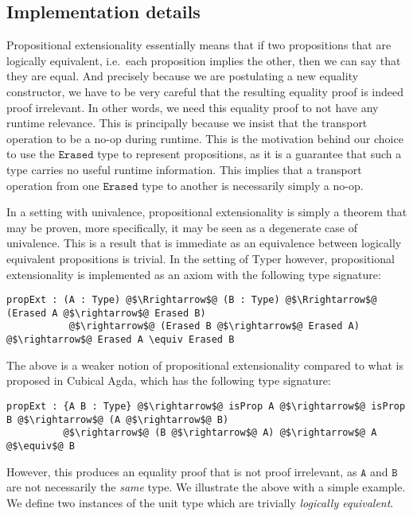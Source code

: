 \documentclass[12pt,twoside,maitrise]{dms}
\theoremstyle{definition}
\numberwithin{equation}{section}
\numberwithin{table}{chapter}
\numberwithin{figure}{chapter}
\newcommand\id[1] {\texttt{#1}}
\begin{document}
\subsection*{Implementation details}

Propositional extensionality essentially means that if two propositions that are
logically equivalent, i.e.\ each proposition implies the other, then we can say
that they are equal. And precisely because we are postulating a new equality
constructor, we have to be very careful that the resulting equality proof is
indeed proof irrelevant. In other words, we need this equality proof to not have
any runtime relevance. This is principally because we insist that the transport
operation to be a no-op during runtime. This is the motivation behind our choice
to use the $\id{Erased}$ type to represent propositions, as it is a guarantee
that such a type carries no useful runtime information. This implies that a
transport operation from one $\id{Erased}$ type to another is necessarily simply
a no-op.

In a setting with univalence, propositional extensionality is simply a theorem
that may be proven, more specifically, it may be seen as a degenerate case of univalence\cite{sozeau2013univalence}. This is a result that is
immediate as an equivalence between logically equivalent propositions is
trivial. In the setting of Typer however, propositional extensionality is
implemented as an axiom with the following type signature:

\begin{verbatim}
propExt : (A : Type) @$\Rrightarrow$@ (B : Type) @$\Rrightarrow$@ (Erased A @$\rightarrow$@ Erased B)
           @$\rightarrow$@ (Erased B @$\rightarrow$@ Erased A) @$\rightarrow$@ Erased A \equiv Erased B
\end{verbatim}

The above is a weaker notion of propositional extensionality compared to what is
proposed in Cubical Agda, which has the following type signature:

\begin{verbatim}
propExt : {A B : Type} @$\rightarrow$@ isProp A @$\rightarrow$@ isProp B @$\rightarrow$@ (A @$\rightarrow$@ B)
          @$\rightarrow$@ (B @$\rightarrow$@ A) @$\rightarrow$@ A @$\equiv$@ B
\end{verbatim}

However, this produces an equality proof that is not proof irrelevant, as
$\id{A}$ and $\id{B}$ are not necessarily the \emph{same} type. We illustrate
the above with a simple example. We define two instances of the unit type which
are trivially \emph{logically equivalent}.
\end{document}
